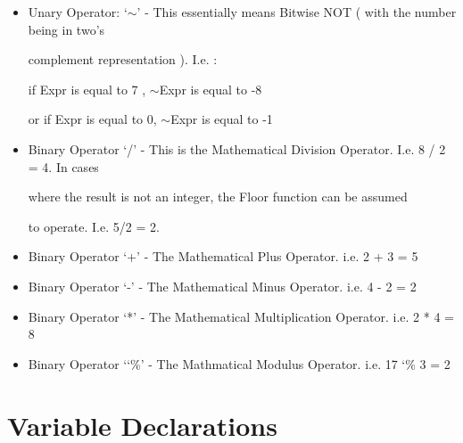 \documentclass[a4wide, 11pt]{article}
\begin{document}
\begin{itemize}

\item
Unary Operator: `$\sim$' - This essentially means Bitwise NOT ( with the number being in two's 

\vspace{0.75mm} \hspace{25mm} \hspace{12mm} complement representation ). I.e. :

\vspace{0.75mm} \hspace{25mm} \hspace{12mm} if Expr is equal to 7 , $\sim$Expr is equal to -8

\vspace{0.75mm} \hspace{25mm} \hspace{12mm} or if Expr is equal to  0, $\sim$Expr is equal to -1 
\item
Binary Operator `/' \hspace{2mm}- This is the Mathematical Division Operator. I.e. 8 / 2 = 4. In cases 

\vspace{0.75mm} \hspace{25mm} \hspace{12mm} where the result is not an integer, the Floor function can be assumed

\vspace{0.75mm} \hspace{25mm} \hspace{12mm} to operate. I.e. 5/2 = 2.
\item
Binary Operator `+' \hspace{1mm}- The Mathematical Plus Operator. i.e. 2 + 3 = 5
\item 
Binary Operator `-'\hspace{3mm} - The Mathematical Minus Operator. i.e. 4 - 2 = 2
\item
Binary Operator `*'\hspace{2.5mm} - The Mathematical Multiplication Operator. i.e. 2 * 4 = 8
\item
Binary Operator `\char`\%'\hspace{1mm} - The Mathmatical Modulus Operator. i.e.  17 \char`\%\hspace{0.57mm} 3 = 2

\end{itemize}

\section{Variable Declarations}
\end{document}
